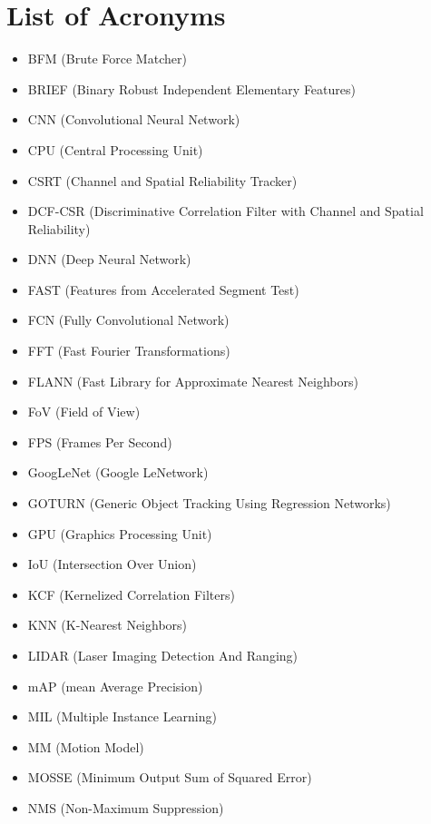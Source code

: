 {}
\listoffigures
\clearpage



\chapter*{List of Acronyms}
\begin{itemize}
	\item BFM (Brute Force Matcher)
	\item BRIEF (Binary Robust Independent Elementary Features)
	\item CNN (Convolutional Neural Network)
	\item CPU (Central Processing Unit)
	\item CSRT (Channel and Spatial Reliability Tracker)
	\item DCF-CSR (Discriminative Correlation Filter with Channel and Spatial Reliability)
	\item DNN (Deep Neural Network)
	\item FAST (Features from Accelerated Segment Test)
	\item FCN (Fully Convolutional Network)
	\item FFT (Fast Fourier Transformations)
	\item FLANN (Fast Library for Approximate Nearest Neighbors)
	\item FoV (Field of View)
	\item FPS (Frames Per Second)
	\item GoogLeNet (Google LeNetwork)
	\item GOTURN (Generic Object Tracking Using Regression Networks)
	\item GPU (Graphics Processing Unit)
	\item IoU (Intersection Over Union)
	\item KCF (Kernelized Correlation Filters)
	\item KNN (K-Nearest Neighbors)
	\item LIDAR (Laser Imaging Detection And Ranging)
	\item mAP (mean Average Precision)
	\item MIL (Multiple Instance Learning)
	\item MM (Motion Model)
	\item MOSSE (Minimum Output Sum of Squared Error)
	\item NMS (Non-Maximum Suppression)

\end{itemize}
